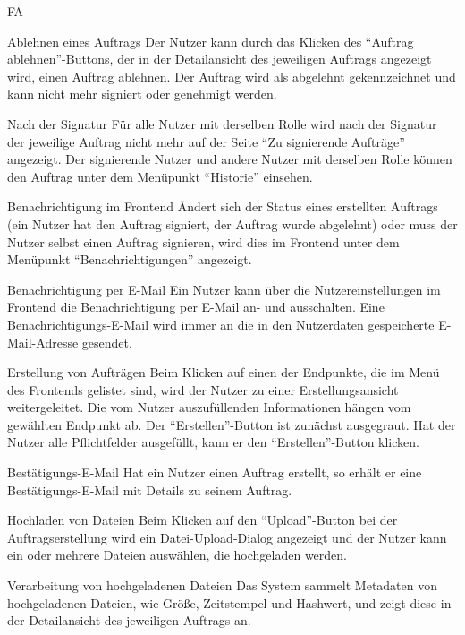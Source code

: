 \begin{Kriterien}{FA}
	\item[Ablehnen eines Auftrags] Der Nutzer kann durch das Klicken des \enquote{Auftrag ablehnen}-Buttons, der in der Detailansicht des jeweiligen Auftrags  angezeigt wird, einen Auftrag ablehnen. Der Auftrag wird als abgelehnt gekennzeichnet und kann nicht mehr signiert oder genehmigt werden.

	\item[Nach der Signatur] Für alle Nutzer mit derselben Rolle wird nach der Signatur der jeweilige Auftrag nicht mehr auf der Seite \enquote{Zu signierende Aufträge} angezeigt. Der signierende Nutzer und andere Nutzer mit derselben Rolle können den Auftrag unter dem Menüpunkt \enquote{Historie} einsehen.


	\item[Benachrichtigung im Frontend] Ändert sich der Status eines erstellten Auftrags (ein Nutzer hat den Auftrag signiert, der Auftrag wurde abgelehnt) oder muss der Nutzer selbst einen Auftrag signieren, wird dies im Frontend unter dem Menüpunkt \enquote{Benachrichtigungen} angezeigt.

	\item[Benachrichtigung per E-Mail] Ein Nutzer kann über die Nutzereinstellungen im Frontend die Benachrichtigung per E-Mail an- und ausschalten. Eine Benachrichtigungs-E-Mail wird immer an die in den Nutzerdaten gespeicherte E-Mail-Adresse gesendet.

	\item[Erstellung von Aufträgen] Beim Klicken auf einen der Endpunkte, die im Menü des Frontends gelistet sind, wird der Nutzer zu einer Erstellungsansicht weitergeleitet.
	Die vom Nutzer auszufüllenden Informationen hängen vom gewählten Endpunkt ab. Der \enquote{Erstellen}-Button ist zunächst ausgegraut. Hat der Nutzer alle Pflichtfelder ausgefüllt, kann er den \enquote{Erstellen}-Button klicken.

	\item[Bestätigungs-E-Mail] Hat ein Nutzer einen Auftrag erstellt, so erhält er eine Bestätigungs-E-Mail mit Details zu seinem Auftrag.
		
	\item[Hochladen von Dateien] Beim Klicken auf den \enquote{Upload}-Button bei der Auftragserstellung wird ein Datei-Upload-Dialog angezeigt und der Nutzer kann ein oder mehrere Dateien auswählen, die hochgeladen werden.

	\item[Verarbeitung von hochgeladenen Dateien] Das \gls{System} sammelt Metadaten von hochgeladenen Dateien, wie Größe, Zeitstempel und Hashwert, und zeigt diese in der Detailansicht des jeweiligen Auftrags an.
	

\end{Kriterien}
